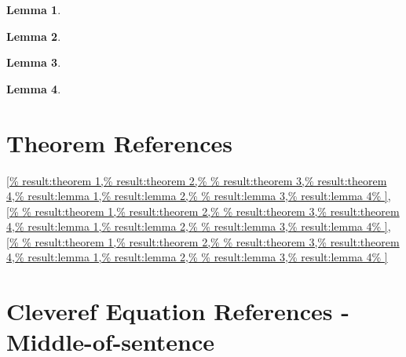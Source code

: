 \documentclass{article}
\newtheorem{lemma}{Lemma}
\begin{document}
  \begin{lemma} 
    \label{result:lemma 1}
  \end{lemma}
  \begin{lemma}
    \label{result:lemma 2}
  \end{lemma}
  \begin{lemma}
    \label{result:lemma 3}
  \end{lemma}
  \begin{lemma}
    \label{result:lemma 4}
  \end{lemma}
  

  \section*{Theorem References}
  \cref{%
    result:theorem 1,%
    result:theorem 2,%
    result:theorem 4,%
    result:lemma 1,%
    result:lemma 2,%
    result:lemma 4%
  }, 
  \cref{%
    result:theorem 2,%
    result:theorem 4,%
    result:lemma 1,%
    result:lemma 2,%
    result:lemma 4%
  },  
  \cref{%
    result:theorem 2,%
    result:theorem 4,%
    result:lemma 1,%
    result:lemma 2,%
    result:lemma 4%
  }  

  \section*{Cleveref Equation References - Middle-of-sentence}
\end{document}
